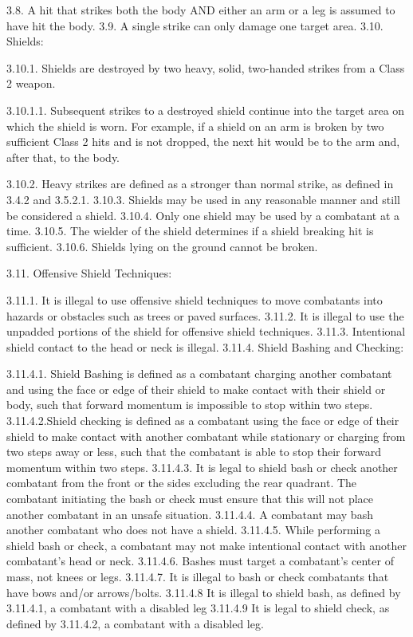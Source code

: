 \documentclass[12pt]{article}
\begin{document}
\begin{level}[start=0]
3.8. A hit that strikes both the body AND either an arm or a leg is assumed to have hit the body.
3.9. A single strike can only damage one target area.
3.10. Shields:

3.10.1. Shields are destroyed by two heavy, solid, two-handed strikes from a Class 2 weapon.

3.10.1.1. Subsequent strikes to a destroyed shield continue into the target area on which the shield is worn. For example, if a shield on an arm is broken by two sufficient Class 2 hits and is not dropped, the next hit would be to the arm and, after that, to the body.

3.10.2. Heavy strikes are defined as a stronger than normal strike, as defined in 3.4.2 and 3.5.2.1.
3.10.3. Shields may be used in any reasonable manner and still be considered a shield.
3.10.4. Only one shield may be used by a combatant at a time.
3.10.5. The wielder of the shield determines if a shield breaking hit is sufficient.
3.10.6. Shields lying on the ground cannot be broken.

3.11. Offensive Shield Techniques:

3.11.1. It is illegal to use offensive shield techniques to move combatants into hazards or obstacles such as trees or paved surfaces.
3.11.2. It is illegal to use the unpadded portions of the shield for offensive shield techniques.
3.11.3. Intentional shield contact to the head or neck is illegal.
3.11.4. Shield Bashing and Checking:

3.11.4.1. Shield Bashing is defined as a combatant charging another combatant and using the face or edge of their shield to make contact with their shield or body, such that forward momentum is impossible to stop within two steps.
3.11.4.2.Shield checking is defined as a combatant using the face or edge of their shield to make contact with another combatant while stationary or charging from two steps away or less, such that the combatant is able to stop their forward momentum within two steps.
3.11.4.3. It is legal to shield bash or check another combatant from the front or the sides excluding the rear quadrant. The combatant initiating the bash or check must ensure that this will not place another combatant in an unsafe situation.
3.11.4.4. A combatant may bash another combatant who does not have a shield.
3.11.4.5. While performing a shield bash or check, a combatant may not make intentional contact with another combatant’s head or neck.
3.11.4.6. Bashes must target a combatant’s center of mass, not knees or legs.
3.11.4.7. It is illegal to bash or check combatants that have bows and/or arrows/bolts.
3.11.4.8 It is illegal to shield bash, as defined by 3.11.4.1, a combatant with a disabled leg
3.11.4.9 It is legal to shield check, as defined by 3.11.4.2, a combatant with a disabled leg.


\end{level}
\end{document}
